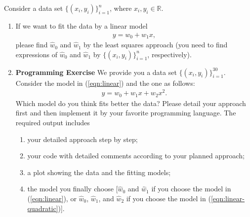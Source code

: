 \documentclass[11pt,letter,notitlepage]{article}
\theoremstyle{definition}
\begin{document}
	\begin{exercise}
		Consider a data set $\{ (x_i ,y_i) \}_{i=1}^{n}$, where $x_i,y_i\in \mathbb{R}$. 
		\begin{enumerate}
			\item If we want to fit the data by a linear model
			\begin{align}\label{eqn:linear}
				y =  w_0 + w_1 x,
			\end{align}
			please find $\hat{w}_0$ and $\hat{w}_1$ by the least squares approach (you need to find expressions of $\hat{w}_0$ and $\hat{w}_1$ by $\{ (x_i ,y_i) \}_{i=1}^{n}$, respectively).
			\item \textbf{Programming Exercise} We provide you a data set $\{ (x_i ,y_i) \}_{i=1}^{30}$. Consider the model in (\ref{eqn:linear}) and the one as follows:
			\begin{align}\label{eqn:linear-quadratic}
				y =  w_0 + w_1 x+ w_2 x^2. 
			\end{align}
			Which model do you think fits better the data? Please detail your approach first and then implement it by your favorite programming language. The required output includes 
			\begin{enumerate}
				\item your detailed approach step by step; 
				\item your code with detailed comments according to your planned approach; 
				\item a plot showing the data and the fitting models; 
				\item the model you finally choose [$\hat{w}_0$ and $\hat{w}_1$ if you choose the model in (\ref{eqn:linear}), or $\hat{w}_0$, $\hat{w}_1$, and $\hat{w}_2$ if you choose the model in (\ref{eqn:linear-quadratic})].
			\end{enumerate}
		\end{enumerate}
		
	\end{exercise}
	
	\begin{solution}
		
	\end{solution}
	\newpage
	
	
	
\end{document}
